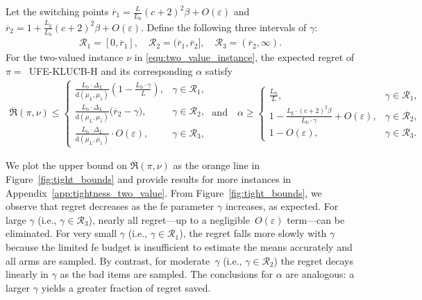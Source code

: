\documentclass[twoside,11pt]{article}
\newcommand{\rmb}{\mathrm{b}}
\newcommand{\rmd}{\mathrm{d}}
\newcommand{\rmg}{\mathrm{g}}
\newcommand{\ouralg}{\textsc{UFE-KLUCB-H}}
\begin{document}
\begin{corollary}\label{cor:upbd_two_value}
   Let the switching points $\overline{r}_1 = \frac{L}{L_{\rmb}} (c+2)^2\beta + O(\varepsilon)$ and $\overline{r}_2 = 1 +  \frac{L_{\rmg}}{L_{\rmb}} (c+2)^2\beta\!+\!O(\varepsilon)$.  Define the following three intervals of $\gamma$:  
    \begin{align}
             \mathcal{R}_1   = [0,\overline{r}_1] ,\quad\mathcal{R}_2 = (\overline{r}_1, \overline{r}_2], \quad\mathcal{R}_3= (\overline{r}_2,\infty).
    \end{align}
    For the two-valued instance $\nu$ in \eqref{equ:two_value_instance}, the expected regret of $\pi=$\ \ouralg{} and its corresponding $\alpha$  satisfy
    \begin{align}
        \overline{\mathfrak{R}}(\pi,\nu)\le\left\{\! \begin{array}{ll}
            \frac{L_{\rmb}\cdot\Delta_{L}}{\rmd(\mu_L,\mu_1)}(1-\frac{L_{\rmb}\cdot\gamma}{L}), & \gamma \in \mathcal{R}_1, \\
               \frac{L_{\rmb}\cdot \Delta_{L}}{\rmd(\mu_L,\mu_1)}\big(\overline{r}_2-\gamma\big),& \gamma \in \mathcal{R}_2,\\
               \frac{L_{\rmb}\cdot \Delta_{L}}{\rmd(\mu_L,\mu_1)}\cdot O(\varepsilon), & \gamma \in \mathcal{R}_3,
        \end{array}  \right. 
    \; \mbox{and}\quad
        \alpha\ge \left\{ \begin{array}{ll}
              \frac{L_{\rmb}}{L},& \gamma \in \mathcal{R}_1 , \\
              1-\frac{L_{\rmg}\cdot (c+2)^2\beta}{L_{\rmb}\cdot\gamma}+O(\varepsilon),&\gamma \in \mathcal{R}_2, \\ 
            1-O(\varepsilon) ,&\gamma \in \mathcal{R}_3.
        \end{array} \right  .\label{equ:alpha_two_value_maintext}
    \end{align}
\end{corollary}
We plot the upper bound on $\overline{\mathfrak{R}}(\pi,\nu)$ as the orange line in Figure~\ref{fig:tight_bounds} and  provide results for more instances in Appendix~\ref{app:tightness_two_value}.  From Figure~\ref{fig:tight_bounds}, we observe that regret decreases as the \ac{fe} parameter $\gamma$ increases, as expected. For large $\gamma$ (i.e., $\gamma\in\mathcal{R}_3$), nearly all regret—up to a negligible~$O(\varepsilon)$ term—can be eliminated. For very small $\gamma$ (i.e., $\gamma\in\mathcal{R}_1$), the regret falls more slowly with $\gamma$ because the limited \ac{fe} budget is insufficient to estimate the means accurately and all arms are sampled. By contrast, for moderate~$\gamma$ (i.e., $\gamma\in\mathcal{R}_2$) the regret decays linearly in $\gamma$ as the bad items are sampled. The conclusions for $\alpha$ are analogous: a larger $\gamma$ yields a greater fraction of regret saved.
\end{document}
